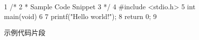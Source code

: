 \begin{figure}
{ \scriptsize
\begin{verbbox}
  1 /*
  2  * Sample Code Snippet
  3  */
  4  #include <stdio.h>
  5  int main(void)
  6  {
  7    printf("Hello world!\n");
  8    return 0;
  9  }
\end{verbbox}
}
\centering
\theverbbox
\caption{示例代码片段}
\label{fig:app:styleguide:Sample Code Snippet}
\end{figure}
